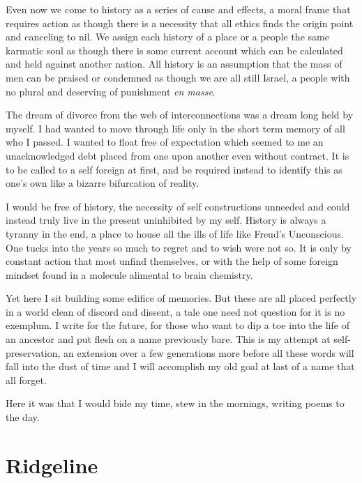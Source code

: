\documentclass[ebook, 10pt, openright, onecolumn]{memoir}
\newcommand*\td[1]{
  \todo[inline]{
     #1 
  }
}
\newcommand*\finish{\td{ ----- Finish this section -----}}
\begin{document}
Even now we come to history as a series of cause and effects, a moral frame that
requires action as though there is a necessity that all ethics finds the origin
point and canceling to nil.  We assign each history of a place or a people the
same karmatic soul as though there is some current account which can be
calculated and held against another nation.  All history is an assumption that
the mass of men can be praised or condemned as though we are all still Israel, a
people with no plural and deserving of punishment \textit{en masse}.

\finish

The dream of divorce from the web of interconnections was a dream long held by
myself.  I had wanted to move through life only in the short term memory of all
who I passed.  I wanted to float free of expectation which seemed to me an
unacknowledged debt placed from one upon another even without contract.  It is
to be called to a self foreign at first, and be required instead to identify
this as one's own like a bizarre bifurcation of reality.

I would be free of history, the necessity of self constructions unneeded and
could instead truly live in the present uninhibited by my self.  History is
always a tyranny in the end, a place to house all the ills of life like Freud's
Unconscious.  One tucks into the years so much to regret and to wish were not
so.  It is only by constant action that most unfind themselves, or with the help
of some foreign mindset found in a molecule alimental to brain chemistry.

Yet here I sit building some edifice of memories.  But these are all placed
perfectly in a world clean of discord and dissent, a tale one need not question
for it is no exemplum.  I write for the future, for those who want to dip a toe
into the life of an ancestor and put flesh on a name previously bare.  This is
my attempt at self-preservation, an extension over a few generations more before
all these words will fall into the dust of time and I will accomplish my old
goal at last of a name that all forget.

Here it was that I would bide my time, stew in the mornings, writing poems to the
day.

\chapter{Ridgeline}
\label{cha:ridgeline}
\end{document}
